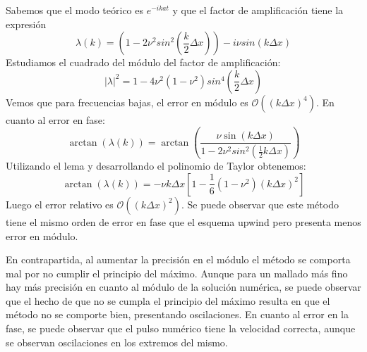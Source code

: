 \documentclass[spanish]{mathnotes}
\begin{document}
	Sabemos que el modo teórico es $e^{-ikat}$ y que el factor de amplificación tiene la expresión
	$$\lambda(k) = \left(1-2\nu^2sin^2\left(\frac{k}{2}\Delta x\right)\right)-i\nu sin(k\Delta x)$$
	Estudiamos el cuadrado del módulo del factor de amplificación:
	$$|\lambda|^2 = 1-4\nu^2(1-\nu^2)sin^4\left(\frac{k}{2}\Delta x\right)$$
	Vemos que para frecuencias bajas, el error en módulo es $\mathcal{O}((k\Delta x)^4)$. En cuanto al error en fase:
	$$\arctan(\lambda(k)) = \arctan\left(\frac{\nu \sin (k\Delta x)}{1-2\nu^2sin^2(\frac{1}{2}k\Delta x)}\right)$$
	Utilizando el lema y desarrollando el polinomio de Taylor obtenemos:
	$$\arctan(\lambda(k)) = -\nu k\Delta x\left[1-\frac{1}{6}(1-\nu^2)(k\Delta x)^2\right]$$
	Luego el error relativo es $\mathcal{O}((k\Delta x)^2)$.
	Se puede observar que este método tiene el mismo orden de error en fase que el esquema upwind pero presenta menos error en módulo. 
	
	En contrapartida, al aumentar la precisión en el módulo el método se comporta mal por no cumplir el principio del máximo.
	Aunque para un mallado más fino hay más precisión en cuanto al módulo de la solución numérica, se puede observar que el hecho de que no se cumpla el principio del máximo resulta en que el método no se comporte bien, presentando oscilaciones. En cuanto al error en la fase, se puede observar que el pulso numérico tiene la velocidad correcta, aunque se observan oscilaciones en los extremos del mismo.
\end{document}
